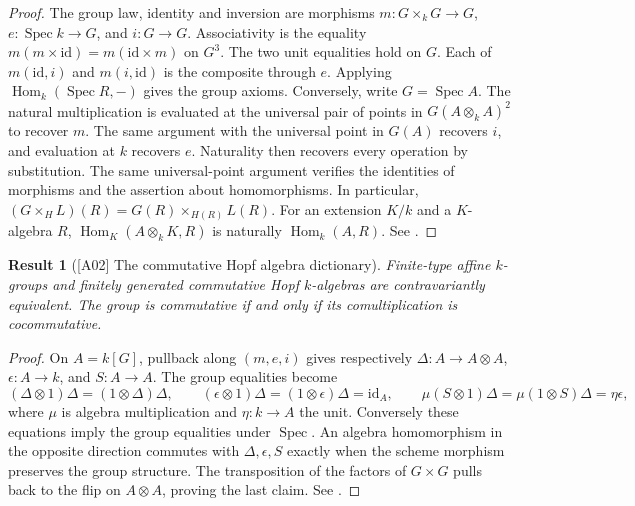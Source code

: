 \documentclass[11pt,a4paper,openany,oneside]{book}
\theoremstyle{resultstyle}
\newtheorem{statement}{Result}[chapter]
\newenvironment{result}[2]{\clubpenalty=10000\begin{statement}[\textnormal{[#1]} #2]\leavevmode\label{res:#1}\ignorespaces}{\end{statement}}
\theoremstyle{definition}
\numberwithin{equation}{chapter}
\begin{document}
\begin{proof}
The group law, identity and inversion are morphisms \(m:G\times_kG\to G\),
\(e:\operatorname{Spec}k\to G\), and \(i:G\to G\). Associativity is the
equality \(m(m\times\mathrm{id})=m(\mathrm{id}\times m)\) on \(G^3\).
The two unit equalities hold on \(G\). Each of
\(m(\mathrm{id},i)\) and \(m(i,\mathrm{id})\) is the composite through
\(e\). Applying \(\operatorname{Hom}_k(\operatorname{Spec}R,-)\) gives
the group axioms. Conversely, write \(G=\operatorname{Spec}A\).
The natural multiplication is evaluated at the universal pair of
points in \(G(A\otimes_k A)^2\) to recover \(m\). The same argument with
the universal point in \(G(A)\) recovers \(i\), and evaluation at \(k\)
recovers \(e\). Naturality then recovers every operation by substitution.
The same universal-point argument verifies the identities of morphisms
and the assertion about homomorphisms. In particular,
\((G\times_H L)(R)=G(R)\times_{H(R)}L(R)\). For an extension \(K/k\)
and a \(K\)-algebra \(R\), \(\operatorname{Hom}_K(A\otimes_k K,R)\)
is naturally \(\operatorname{Hom}_k(A,R)\).
See \cite[Definitions 1.1--1.3 and \S1.h]{milne}.
\end{proof}

\begin{result}{A02}{The commutative Hopf algebra dictionary}
Finite-type affine \(k\)-groups and finitely generated commutative Hopf
\(k\)-algebras are contravariantly equivalent. The group is commutative
if and only if its comultiplication is cocommutative.
\end{result}

\begin{proof}
On \(A=k[G]\), pullback along \((m,e,i)\) gives respectively
\(\Delta:A\to A\otimes A\), \(\epsilon:A\to k\), and \(S:A\to A\).
The group equalities become
\[
 (\Delta\otimes1)\Delta=(1\otimes\Delta)\Delta,\qquad
 (\epsilon\otimes1)\Delta=(1\otimes\epsilon)\Delta=\mathrm{id}_A,
 \qquad
 \mu(S\otimes1)\Delta=\mu(1\otimes S)\Delta=\eta\epsilon,
\]
where \(\mu\) is algebra multiplication and \(\eta:k\to A\) the unit.
Conversely these equations imply the group equalities under
\(\operatorname{Spec}\). An algebra homomorphism in the opposite direction
commutes with \(\Delta,\epsilon,S\) exactly when the scheme morphism
preserves the group structure. The transposition of the factors of
\(G\times G\) pulls back to the flip on \(A\otimes A\), proving the last
claim. See \cite[Propositions 1.25, 3.1, 3.6 and Corollary 3.7]{milne}.
\end{proof}
\end{document}
